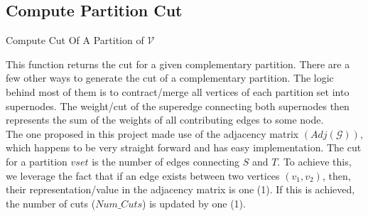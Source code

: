 \documentclass[longpaper, english, final, times]{revdetua}
\begin{document}
			\subsection{Compute Partition Cut}
				\begin{algorithm}
					\caption{Compute Cut Of A Partition of $\mathcal{V}$}
					\label{algorithm:GetPartCut}
					
					\DontPrintSemicolon
					
					
					
				\end{algorithm}
				
				This function returns the cut for a given complementary partition. There are a few other ways to generate the cut of a complementary partition. The logic behind most of them is to contract/merge all vertices of each partition set into supernodes. The weight/cut of the superedge connecting both supernodes then represents the sum of the weights of all contributing edges to some node.\\
				
				The one proposed in this project made use of the adjacency matrix $(Adj(\mathcal{G}))$, which happens to be very straight forward and has easy implementation. The cut for a partition $vset$ is the number of edges connecting $S$ and $T$. To achieve this, we leverage the fact that if an edge exists between two vertices $(v_1, v_2)$, then, their representation/value in the adjacency matrix is one (1). If this is achieved, the number of cuts ($Num\_Cuts$) is updated by one (1).\\
				
\end{document}
